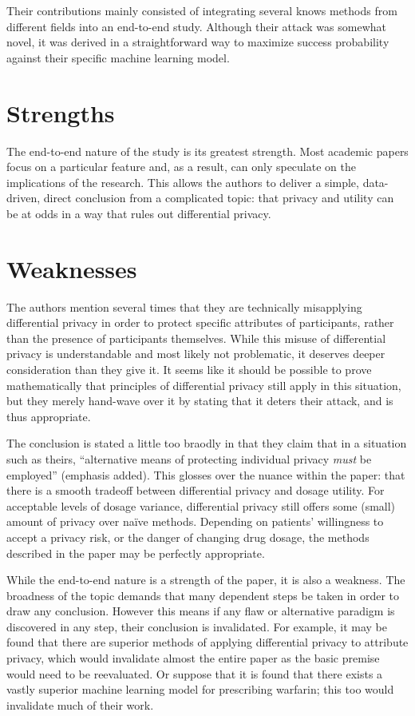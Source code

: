 \documentclass{article}
\begin{document}
Their contributions mainly consisted of integrating several knows methods from
different fields into an end-to-end study. Although their attack was somewhat
novel, it was derived in a straightforward way to maximize success probability
against their specific machine learning model.

\section{Strengths}

The end-to-end nature of the study is its greatest strength. Most academic
papers focus on a particular feature and, as a result, can only speculate on the
implications of the research. This allows the authors to deliver a simple,
data-driven, direct conclusion from a complicated topic: that privacy and
utility can be at odds in a way that rules out differential privacy.

\section{Weaknesses}

The authors mention several times that they are technically misapplying
differential privacy in order to protect specific attributes of participants,
rather than the presence of participants themselves. While this misuse of
differential privacy is understandable and most likely not problematic, it
deserves deeper consideration than they give it. It seems like it should be
possible to prove mathematically that principles of differential privacy still
apply in this situation, but they merely hand-wave over it by stating that it
deters their attack, and is thus appropriate.

The conclusion is stated a little too braodly in that they claim that in a
situation such as theirs, ``alternative means of protecting individual privacy
{\it must} be employed'' (emphasis added). This glosses over the nuance within
the paper: that there is a smooth tradeoff between differential privacy and
dosage utility. For acceptable levels of dosage variance, differential privacy
still offers some (small) amount of privacy over na\"ive methods. Depending on
patients' willingness to accept a privacy risk, or the danger of changing drug
dosage, the methods described in the paper may be perfectly appropriate.

While the end-to-end nature is a strength of the paper, it is also a weakness.
The broadness of the topic demands that many dependent steps be taken in order
to draw any conclusion. However this means if any flaw or alternative paradigm
is discovered in any step, their conclusion is invalidated. For example, it
may be found that there are superior methods of applying differential privacy to
attribute privacy, which would invalidate almost the entire paper as the basic
premise would need to be reevaluated. Or suppose that it is found that there
exists a vastly superior machine learning model for prescribing warfarin; this
too would invalidate much of their work.
\end{document}
